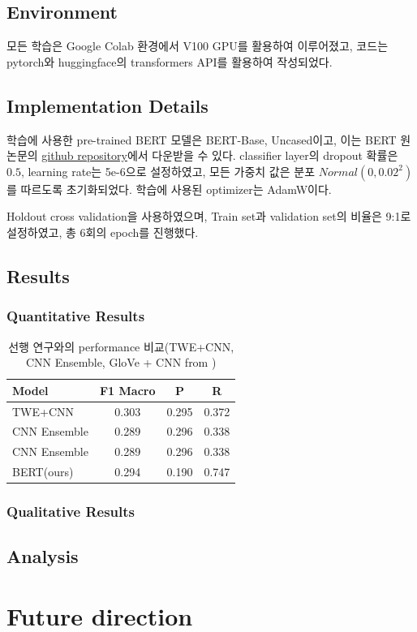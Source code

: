 \documentclass{article}
\begin{document}
\subsection{Environment}
모든 학습은 Google Colab 환경에서 V100 GPU를 활용하여 이루어졌고, 
코드는 pytorch와 huggingface의 transformers API를 활용하여 작성되었다.

\subsection{Implementation Details}
학습에 사용한 pre-trained BERT 모델은 BERT-Base, Uncased이고, 이는 BERT 원 논문의 \href{https://github.com/google-research/bert}{github repository}에서 다운받을 수 있다.
classifier layer의 dropout 확률은 $0.5$, learning rate는 5e-6으로 설정하였고, 모든 가중치 값은 분포 $Normal(0, 0.02^2)$를 따르도록 초기화되었다.
학습에 사용된 optimizer는 AdamW\cite{loshchilov2019decoupled}이다.

Holdout cross validation을 사용하였으며, Train set과 validation set의 비율은 9:1로 설정하였고, 총 6회의 epoch를 진행했다.

\subsection{Results}
\subsubsection{Quantitative Results}
\begin{table}[htb!]
    \begin{center}
        \begin{tabular}{lccc}\toprule
            Model & F1 Macro & P & R\\\midrule
            TWE+CNN & 0.303 & 0.295 & 0.372 \\
            CNN Ensemble & 0.289 & 0.296 & 0.338 \\
            CNN Ensemble & 0.289 & 0.296 & 0.338 \\\midrule
            BERT(ours) & 0.294 & 0.190 & 0.747\\\bottomrule
        \end{tabular}
        \caption{선행 연구와의 performance 비교(TWE+CNN, CNN Ensemble, GloVe + CNN from \cite{athavale2019})}
        \label{perf}
    \end{center}
\end{table}

\subsubsection{Qualitative Results}

\subsection{Analysis}


\section{Future direction}

\newpage


\end{document}
